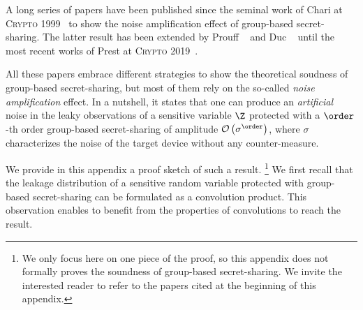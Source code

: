 A long series of papers have been published since the seminal work of Chari \etal{} at \textsc{Crypto 1999}~\cite{chari_towards_1999} to show the noise amplification effect of group-based secret-sharing.
The latter result has been extended by Prouff \etal{}~\cite{prouff_masking_2013} and Duc \etal{}~\cite{duc_unifying_2019,duc_making_2019,dziembowski_optimal_2016} until the most recent works of Prest \etal{} at \textsc{Crypto 2019}~\cite{prest_renyi_2019}.

All these papers embrace different strategies to show the theoretical soudness of group-based secret-sharing, but most of them rely on the so-called \emph{noise amplification} effect.
In a nutshell, it states that one can produce an \emph{artificial} noise in the leaky observations of a sensitive variable \(\Z\) protected with a \(\order\)-th order group-based secret-sharing of amplitude \(\mathcal{O}\left(\sigma^\order\right)\), where \(\sigma\) characterizes the noise of the target device without any counter-measure.

We provide in this appendix a proof sketch of such a result.%
\footnote{
    We only focus here on one piece of the proof, so this appendix does not formally proves the soundness of group-based secret-sharing.
    We invite the interested reader to refer to the papers cited at the beginning of this appendix.
}
We first recall that the leakage distribution of a sensitive random variable protected with group-based secret-sharing can be formulated as a convolution product.
This observation enables to benefit from the properties of convolutions to reach the result.

